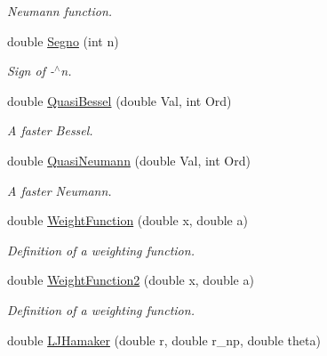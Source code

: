 \begin{DoxyCompactItemize}
\begin{DoxyCompactList}\small\item\em Neumann function. \end{DoxyCompactList}\item 
double \hyperlink{classMatematica_a3ea54c21e1dfc6cb0108483eca97f7cd}{Segno} (int n)\hypertarget{classMatematica_a3ea54c21e1dfc6cb0108483eca97f7cd}{}\label{classMatematica_a3ea54c21e1dfc6cb0108483eca97f7cd}

\begin{DoxyCompactList}\small\item\em Sign of -\/$^\wedge$n. \end{DoxyCompactList}\item 
double \hyperlink{classMatematica_af5ab240211f6f0aeada6022a32585acb}{Quasi\+Bessel} (double Val, int Ord)\hypertarget{classMatematica_af5ab240211f6f0aeada6022a32585acb}{}\label{classMatematica_af5ab240211f6f0aeada6022a32585acb}

\begin{DoxyCompactList}\small\item\em A faster Bessel. \end{DoxyCompactList}\item 
double \hyperlink{classMatematica_abee4e33f52ba1babbe9d2422e835ece5}{Quasi\+Neumann} (double Val, int Ord)\hypertarget{classMatematica_abee4e33f52ba1babbe9d2422e835ece5}{}\label{classMatematica_abee4e33f52ba1babbe9d2422e835ece5}

\begin{DoxyCompactList}\small\item\em A faster Neumann. \end{DoxyCompactList}\item 
double \hyperlink{classMatematica_a8ffbe3b65717720f6a91536c9be08c12}{Weight\+Function} (double x, double a)\hypertarget{classMatematica_a8ffbe3b65717720f6a91536c9be08c12}{}\label{classMatematica_a8ffbe3b65717720f6a91536c9be08c12}

\begin{DoxyCompactList}\small\item\em Definition of a weighting function. \end{DoxyCompactList}\item 
double \hyperlink{classMatematica_a3381e7982dc433288e7ddac251a8e995}{Weight\+Function2} (double x, double a)\hypertarget{classMatematica_a3381e7982dc433288e7ddac251a8e995}{}\label{classMatematica_a3381e7982dc433288e7ddac251a8e995}

\begin{DoxyCompactList}\small\item\em Definition of a weighting function. \end{DoxyCompactList}\item 
double \hyperlink{classMatematica_aac48860fd7ddec8063e83f2a401d964e}{L\+J\+Hamaker} (double r, double r\+\_\+np, double theta)\hypertarget{classMatematica_aac48860fd7ddec8063e83f2a401d964e}{}\label{classMatematica_aac48860fd7ddec8063e83f2a401d964e}


\end{DoxyCompactItemize}
